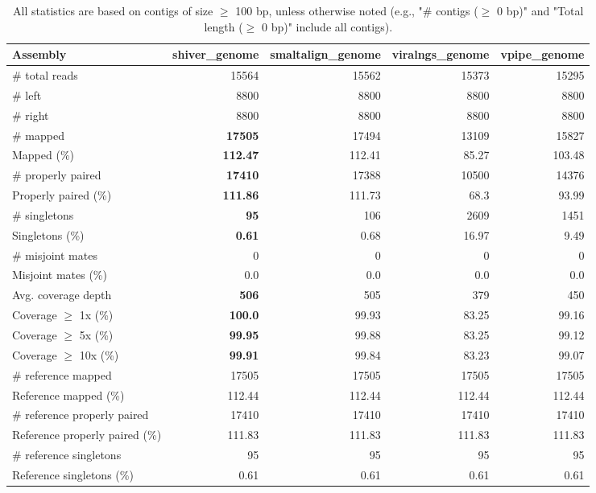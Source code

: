 \documentclass[12pt,a4paper]{article}
\begin{document}
\begin{table}[ht]
\begin{center}
\caption{All statistics are based on contigs of size $\geq$ 100 bp, unless otherwise noted (e.g., "\# contigs ($\geq$ 0 bp)" and "Total length ($\geq$ 0 bp)" include all contigs).}
\begin{tabular}{|l*{4}{|r}|}
\hline
Assembly & shiver\_genome & smaltalign\_genome & viralngs\_genome & vpipe\_genome \\ \hline
\# total reads & 15564 & 15562 & 15373 & 15295 \\ \hline
\# left & 8800 & 8800 & 8800 & 8800 \\ \hline
\# right & 8800 & 8800 & 8800 & 8800 \\ \hline
\# mapped & {\bf 17505} & 17494 & 13109 & 15827 \\ \hline
Mapped (\%) & {\bf 112.47} & 112.41 & 85.27 & 103.48 \\ \hline
\# properly paired & {\bf 17410} & 17388 & 10500 & 14376 \\ \hline
Properly paired (\%) & {\bf 111.86} & 111.73 & 68.3 & 93.99 \\ \hline
\# singletons & {\bf 95} & 106 & 2609 & 1451 \\ \hline
Singletons (\%) & {\bf 0.61} & 0.68 & 16.97 & 9.49 \\ \hline
\# misjoint mates & 0 & 0 & 0 & 0 \\ \hline
Misjoint mates (\%) & 0.0 & 0.0 & 0.0 & 0.0 \\ \hline
Avg. coverage depth & {\bf 506} & 505 & 379 & 450 \\ \hline
Coverage $\geq$ 1x (\%) & {\bf 100.0} & 99.93 & 83.25 & 99.16 \\ \hline
Coverage $\geq$ 5x (\%) & {\bf 99.95} & 99.88 & 83.25 & 99.12 \\ \hline
Coverage $\geq$ 10x (\%) & {\bf 99.91} & 99.84 & 83.23 & 99.07 \\ \hline
\# reference mapped & 17505 & 17505 & 17505 & 17505 \\ \hline
Reference mapped (\%) & 112.44 & 112.44 & 112.44 & 112.44 \\ \hline
\# reference properly paired & 17410 & 17410 & 17410 & 17410 \\ \hline
Reference properly paired (\%) & 111.83 & 111.83 & 111.83 & 111.83 \\ \hline
\# reference singletons & 95 & 95 & 95 & 95 \\ \hline
Reference singletons (\%) & 0.61 & 0.61 & 0.61 & 0.61 \\ \hline

\end{tabular}
\end{center}
\end{table}
\end{document}
